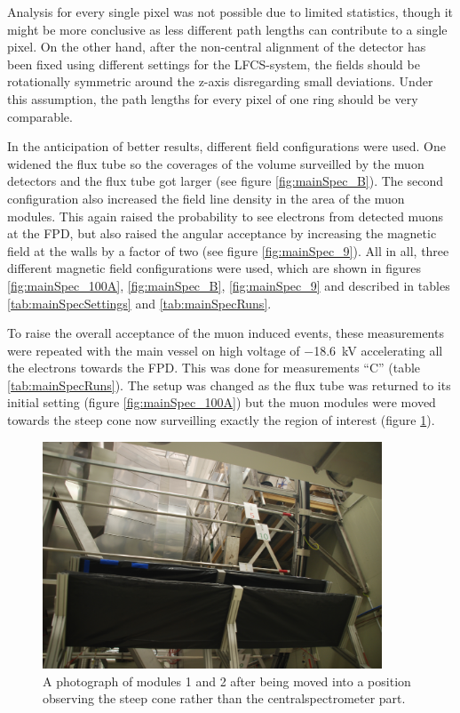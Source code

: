   Analysis for every single pixel was not possible due to limited statistics, though it might be more conclusive as less different path lengths can contribute to a single pixel. On the other hand, after the non-central alignment of the detector has been fixed using different settings for the LFCS-system, the fields should be rotationally symmetric around the z-axis disregarding small deviations. Under this assumption, the path lengths for every pixel of one ring should be very comparable.
  
  
  In the anticipation of better results, different field configurations were used. One widened the flux tube so the coverages of the volume surveilled by the muon detectors and the flux tube got larger (see figure \ref{fig:mainSpec_B}). The second configuration also increased the field line density in the area of the muon modules. This again raised the probability to see electrons from detected muons at the FPD, but also raised the angular acceptance by increasing the magnetic field at the walls by a factor of two (see figure \ref{fig:mainSpec_9}).
  All in all, three different magnetic field configurations were used, which are shown in figures \ref{fig:mainSpec_100A}, \ref{fig:mainSpec_B}, \ref{fig:mainSpec_9} and described in tables \ref{tab:mainSpecSettings} and \ref{tab:mainSpecRuns}.
  
	
  To raise the overall acceptance of the muon induced events, these measurements were repeated with the main vessel on high voltage of \SI{-18.6}{\kilo\volt} accelerating all the electrons towards the FPD.
  This was done for measurements ``C'' (table \ref{tab:mainSpecRuns}). The setup was changed as the flux tube was returned to its initial setting (figure \ref{fig:mainSpec_100A}) but the muon modules were moved towards the steep cone now surveilling exactly the region of interest (figure \ref{fig:12steepCone}).
  
  \begin{figure}
  	\centering
  	\includegraphics[width = 0.9\textwidth]{graphics/muonModules/mainSpec/12steepCone.jpg}
  	\caption[Modules 1\& 2 at Steep Cone]{A photograph of modules 1 and 2 after being moved into a position observing the steep cone rather than the centralspectrometer part.}
  	\label{fig:12steepCone}
  \end{figure}

